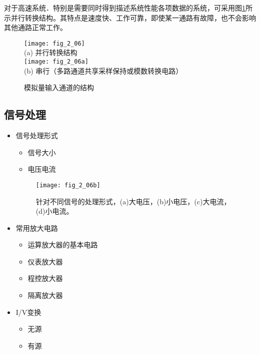 对于高速系统．特别是需要同时得到描述系统性能各项数据的系统，可采用图\ref{fig_2_06}所示并行转换结构。其特点是速度快、工作可靠，即使某一通路有故障，也不会影响其他通路正常工作。


\begin{figure}[h]
  \centering
  \texttt{[image: fig\_2\_06]}\\(a) 并行转换结构\\
  \texttt{[image: fig\_2\_06a]}\\(b) 串行（多路通道共享采样保持或模数转换电路）\\
  \caption{模拟量输入通道的结构}\label{fig_2_06}
\end{figure}




\subsection{信号处理}


\begin{itemize}
  \item 信号处理形式
  \begin{itemize}
    \item 信号大小

    \item 电压电流
  \end{itemize}

\begin{figure}[h]
  \centering
  \texttt{[image: fig\_2\_06b]}
  \caption{针对不同信号的处理形式，(a)大电压，(b)小电压，(c)大电流，(d)小电流。}\label{fig_2_06b}
\end{figure}


  \item 常用放大电路
  \begin{itemize}
    \item 运算放大器的基本电路
    \item 仪表放大器
    \item 程控放大器
    \item 隔离放大器
  \end{itemize}
  \item I/V变换
  \begin{itemize}
    \item 无源
    \item 有源
  \end{itemize}
\end{itemize}


